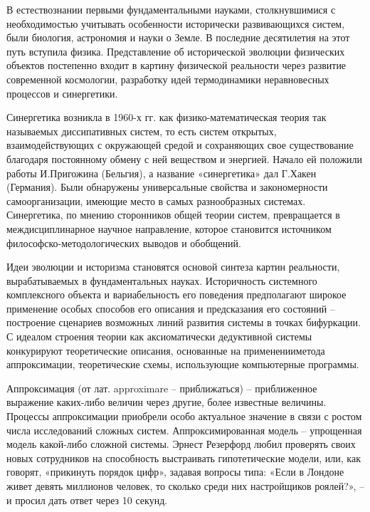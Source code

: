 \documentclass[exam_answers.tex]{subfiles}
\begin{document}
В естествознании первыми фундаментальными науками,
столкнувшимися с необходимостью учитывать особенности исторически
развивающихся систем, были биология, астрономия и науки о Земле. В
последние десятилетия на этот путь вступила физика. Представление об
исторической эволюции физических объектов постепенно входит в
картину физической реальности через развитие современной космологии,
разработку идей термодинамики неравновесных процессов и синергетики.

Синергетика возникла в 1960-х гг. как физико-математическая теория так
называемых диссипативных систем, то есть систем открытых,
взаимодействующих с окружающей средой и сохраняющих свое
существование благодаря постоянному обмену с ней веществом и
энергией. Начало ей положили работы И.Пригожина (Бельгия), а
название «синергетика» дал Г.Хакен (Германия). Были обнаружены
универсальные свойства и закономерности самоорганизации, имеющие
место в самых разнообразных системах. Синергетика, по мнению
сторонников общей теории систем, превращается в междисциплинарное
научное направление, которое становится источником
философско-методологических выводов и обобщений.

Идеи эволюции и историзма становятся основой синтеза картин
реальности, вырабатываемых в фундаментальных науках. Историчность
системного комплексного объекта и вариабельность его поведения
предполагают широкое применение особых способов его описания и
предсказания его состояний – построение сценариев возможных линий
развития системы в точках бифуркации. С идеалом строения теории как
аксиоматически дедуктивной системы конкурируют теоретические
описания, основанные на примененииметода аппроксимации,
теоретические схемы, использующие компьютерные программы.

Аппроксимация (от лат. approximare – приближаться) –
приближенное выражение каких-либо величин через другие, более
известные величины. Процессы аппроксимации приобрели особо актуальное
значение в связи с ростом числа исследований сложных систем.
Аппроксимированная модель – упрощенная модель какой-либо сложной
системы. Эрнест Резерфорд любил проверять своих новых сотрудников
на способность выстраивать гипотетические модели, или, как говорят,
«прикинуть порядок цифр», задавая вопросы типа: «Если в Лондоне
живет девять миллионов человек, то сколько среди них настройщиков
роялей?», – и просил дать ответ через 10 секунд.
\end{document}
